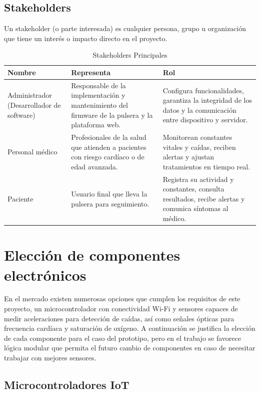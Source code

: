\documentclass[12pt, a4paper]{article}
\begin{document}
		\subsection{Stakeholders}
		
		Un stakeholder (o parte interesada) es cualquier persona, grupo u organización que tiene un interés o impacto directo en el proyecto.
		
		\begin{table}[ht]
			\centering
			\caption{Stakeholders Principales}
			\begin{tabular}{|p{3cm}|p{6cm}|p{7cm}|}
				\hline
				\textbf{Nombre} & \textbf{Representa} & \textbf{Rol} \\ 
				\hline
				Administrador (Desarrollador de software) &
				Responsable de la implementación y mantenimiento del firmware de la pulsera y la plataforma web. &
				Configura funcionalidades, garantiza la integridad de los datos y la comunicación entre dispositivo y servidor. \\
				\hline
				Personal médico &
				Profesionales de la salud que atienden a pacientes con riesgo cardíaco o de edad avanzada. &
				Monitorean constantes vitales y caídas, reciben alertas y ajustan tratamientos en tiempo real. \\
				\hline
				Paciente &
				Usuario final que lleva la pulsera para seguimiento. &
				Registra su actividad y constantes, consulta resultados, recibe alertas y comunica síntomas al médico. \\
				\hline
			\end{tabular}
		\end{table}
	
	\section{Elección de componentes electrónicos}
	
	
	En el mercado existen numerosas opciones que cumplen los requisitos de este proyecto, un microcontrolador con conectividad Wi-Fi y sensores capaces de medir aceleraciones para detección de caídas, así como señales ópticas para frecuencia cardíaca y saturación de oxígeno. A continuación se justifica la elección de cada componente para el caso del prototipo, pero en el trabajo se favorece lógica modular que permita el futuro cambio de componentes en caso de necesitar trabajar con mejores sensores.
	
	\subsection{Microcontroladores IoT}
	
\end{document}
